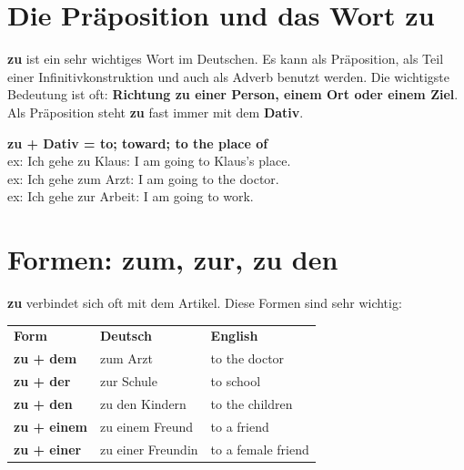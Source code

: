 \documentclass[a4paper,12pt]{article}
\begin{document}
    
    \section{Die Präposition und das Wort \glqq zu\grqq}
        
        \textbf{zu} ist ein sehr wichtiges Wort im Deutschen. Es kann als Präposition, als Teil einer Infinitivkonstruktion und auch als Adverb benutzt werden. Die wichtigste Bedeutung ist oft: \textbf{Richtung zu einer Person, einem Ort oder einem Ziel}. Als Präposition steht \textbf{zu} fast immer mit dem \textbf{Dativ}.
        
        \begin{tcolorbox}[colback=RowBlueLight,colframe=HeaderBlueDark,title=\textbf{Grundregel}]
            \textbf{zu + Dativ = to; toward; to the place of}\\
            ex: Ich gehe zu Klaus: I am going to Klaus's place.\\
            ex: Ich gehe zum Arzt: I am going to the doctor.\\
            ex: Ich gehe zur Arbeit: I am going to work.
        \end{tcolorbox}
    
    
    \section{Formen: zum, zur, zu den}
        
        \textbf{zu} verbindet sich oft mit dem Artikel. Diese Formen sind sehr wichtig:
        
        \begin{tabular}{>{\bfseries}p{4cm}p{5cm}p{5cm}}
            \rowcolor{HeaderBlueDark}
            \color{white}\textbf{Form} & \color{white}\textbf{Deutsch} & \color{white}\textbf{English} \\
            zu + dem                   & zum Arzt                      & to the doctor                 \\
            zu + der                   & zur Schule                    & to school                     \\
            zu + den                   & zu den Kindern                & to the children               \\
            zu + einem                 & zu einem Freund               & to a friend                   \\
            zu + einer                 & zu einer Freundin             & to a female friend            \\
        \end{tabular}
    
\end{document}
